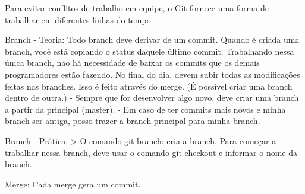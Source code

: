 Para evitar conflitos de trabalho em equipe, o Git fornece uma forma de trabalhar em diferentes linhas do tempo.

Branch - Teoria: Todo branch deve derivar de um commit. 
Quando é criada uma branch, você está copiando o status daquele último commit.
Trabalhando nessa única branch, não há necessidade de baixar os commits que os demais programadores estão fazendo.
No final do dia, devem subir todas as modificações feitas nas branches. Isso é feito através do merge.
(É possível criar uma branch dentro de outra.)
 - Sempre que for desenvolver algo novo, deve criar uma branch a partir da principal (master).
 - Em caso de ter commits mais novos e minha branch ser antiga, posso trazer a branch principal
   para minha branch.

Branch - Prática: 
> O comando git branch: cria a branch. Para começar a trabalhar nessa branch, deve usar o comando
git checkout e informar o nome da branch.

Merge: Cada merge gera um commit.